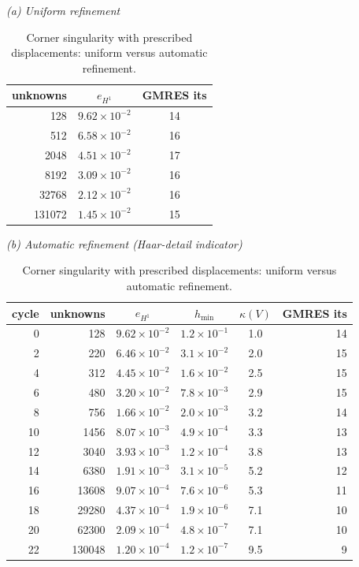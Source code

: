 \documentclass[11pt]{article}
\begin{document}
\begin{table}[htbp]\centering\small
\caption{Corner singularity with prescribed displacements: uniform versus automatic refinement.}
\textit{(a) Uniform refinement}\\[2pt]
\begin{tabular}{rcc}
\toprule
unknowns & $e_{H^1}$ & GMRES its\\
\midrule
128 & $9.62{\times}10^{-2}$ & 14\\
512 & $6.58{\times}10^{-2}$ & 16\\
2048 & $4.51{\times}10^{-2}$ & 17\\
8192 & $3.09{\times}10^{-2}$ & 16\\
32768 & $2.12{\times}10^{-2}$ & 16\\
131072 & $1.45{\times}10^{-2}$ & 15\\
\bottomrule
\end{tabular}

\medskip
\textit{(b) Automatic refinement (Haar-detail indicator)}\\[2pt]
\begin{tabular}{rr ccc r}
\toprule
cycle & unknowns & $e_{H^1}$ & $h_{\min}$ & $\kappa(V)$ & GMRES its\\
\midrule
0 & 128 & $9.62{\times}10^{-2}$ & $1.2{\times}10^{-1}$ & 1.0 & 14\\
2 & 220 & $6.46{\times}10^{-2}$ & $3.1{\times}10^{-2}$ & 2.0 & 15\\
4 & 312 & $4.45{\times}10^{-2}$ & $1.6{\times}10^{-2}$ & 2.5 & 15\\
6 & 480 & $3.20{\times}10^{-2}$ & $7.8{\times}10^{-3}$ & 2.9 & 15\\
8 & 756 & $1.66{\times}10^{-2}$ & $2.0{\times}10^{-3}$ & 3.2 & 14\\
10 & 1456 & $8.07{\times}10^{-3}$ & $4.9{\times}10^{-4}$ & 3.3 & 13\\
12 & 3040 & $3.93{\times}10^{-3}$ & $1.2{\times}10^{-4}$ & 3.8 & 13\\
14 & 6380 & $1.91{\times}10^{-3}$ & $3.1{\times}10^{-5}$ & 5.2 & 12\\
16 & 13608 & $9.07{\times}10^{-4}$ & $7.6{\times}10^{-6}$ & 5.3 & 11\\
18 & 29280 & $4.37{\times}10^{-4}$ & $1.9{\times}10^{-6}$ & 7.1 & 10\\
20 & 62300 & $2.09{\times}10^{-4}$ & $4.8{\times}10^{-7}$ & 7.1 & 10\\
22 & 130048 & $1.20{\times}10^{-4}$ & $1.2{\times}10^{-7}$ & 9.5 & 9\\
\bottomrule
\end{tabular}
\end{table}
\end{document}

